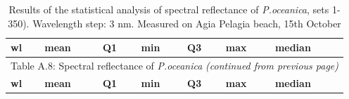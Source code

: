 \documentclass[11pt]{article}
\begin{document}
\begin{appendices}
\begin{longtable}{|c|c|c|c|c|c|c|}
	\caption{Results of the statistical analysis of spectral reflectance of \textit{P.oceanica}, sets 1-350). Wavelength step: 3 nm. Measured on Agia Pelagia beach, 15th October}\label{tab:A.8} \\
	  \multicolumn{1}{|l|}{\textbf{wl}} &
	   \multicolumn{1}{l|}{\textbf{mean}} & 
	   \multicolumn{1}{l|}{\textbf{Q1}} & 
	   \multicolumn{1}{l|}{\textbf{min}} & 
	   \multicolumn{1}{l|}{\textbf{Q3}} & 
	   \multicolumn{1}{l|}{\textbf{max}} & 
	   \multicolumn{1}{l|}{\textbf{median}} \\ \hline
	\endfirsthead

	\multicolumn{7}{c}{Table A.8: Spectral reflectance of \textit{P.oceanica} \textit{(continued from previous page)}}\\
	\hline \multicolumn{1}{|l|}{\textbf{wl}} & \multicolumn{1}{l|}{\textbf{mean}} & \multicolumn{1}{l|}{\textbf{Q1}} & \multicolumn{1}{l|}{\textbf{min}} & \multicolumn{1}{l|}{\textbf{Q3}} & \multicolumn{1}{l|}{\textbf{max}} & \multicolumn{1}{l|}{\textbf{median}} \\ \hline
	\endhead


\end{longtable}
\end{appendices}
\end{document}
